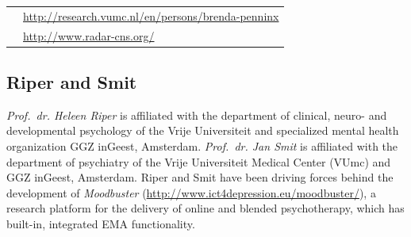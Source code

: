 \documentclass[]{book}
\begin{document}
\begin{longtable}[]{@{}ll@{}}
\begin{minipage}[t]{0.25\columnwidth}
\strut
\end{minipage} & \begin{minipage}[t]{0.69\columnwidth}\raggedright\strut
\url{http://research.vumc.nl/en/persons/brenda-penninx}\strut
\end{minipage}\tabularnewline
\begin{minipage}[t]{0.25\columnwidth}\raggedright\strut
\strut
\end{minipage} & \begin{minipage}[t]{0.69\columnwidth}\raggedright\strut
\url{http://www.radar-cns.org/}\strut
\end{minipage}\tabularnewline
\bottomrule
\end{longtable}

\subsection{Riper and Smit}\label{riper-and-smit}

  

\emph{Prof.~dr. Heleen Riper} is affiliated with the department of
clinical, neuro- and developmental psychology of the Vrije Universiteit
and specialized mental health organization GGZ inGeest, Amsterdam.
\emph{Prof.~dr. Jan Smit} is affiliated with the department of
psychiatry of the Vrije Universiteit Medical Center (VUmc) and GGZ
inGeest, Amsterdam. Riper and Smit have been driving forces behind the
development of \emph{Moodbuster}
(\url{http://www.ict4depression.eu/moodbuster/}), a research platform
for the delivery of online and blended psychotherapy, which has
built-in, integrated EMA functionality.
\end{document}
